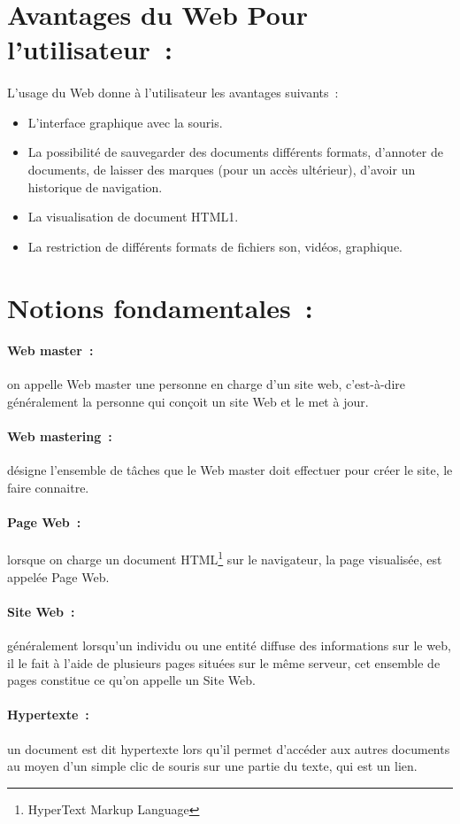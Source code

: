  \section{Avantages du Web Pour l’utilisateur :}
 \paragraph{}
 L’usage du Web donne à l’utilisateur les avantages suivants :
 \begin{itemize}
 	\item L’interface graphique avec la souris.
 	\item La possibilité de sauvegarder des documents différents formats, d’annoter de documents, de laisser des marques (pour un accès ultérieur), d’avoir un historique de navigation.
 	\item La visualisation de document HTML1.
 	\item La restriction de différents formats de fichiers son, vidéos, graphique.
 \end{itemize}
\section{Notions fondamentales : }
\paragraph{Web master :}
on appelle Web master une personne en charge d’un site web, c’est-à-dire généralement la personne qui conçoit un site Web et le met à jour.
\paragraph{Web mastering :}
désigne l’ensemble de tâches que le Web master doit effectuer pour créer le site, le faire connaitre.
\paragraph{Page Web : }
lorsque on charge un document HTML\footnote{HyperText Markup Language} sur le navigateur, la page visualisée, est appelée Page Web.
\paragraph{Site Web : }
généralement lorsqu’un individu ou une entité diffuse des informations sur le web, il le fait à l’aide de plusieurs pages situées sur le même serveur, cet ensemble de pages constitue ce qu’on appelle un Site Web.
\paragraph{Hypertexte : }
un document est dit hypertexte lors qu’il permet d’accéder aux autres documents au moyen d’un simple clic de souris sur une partie du texte, qui est un lien.

